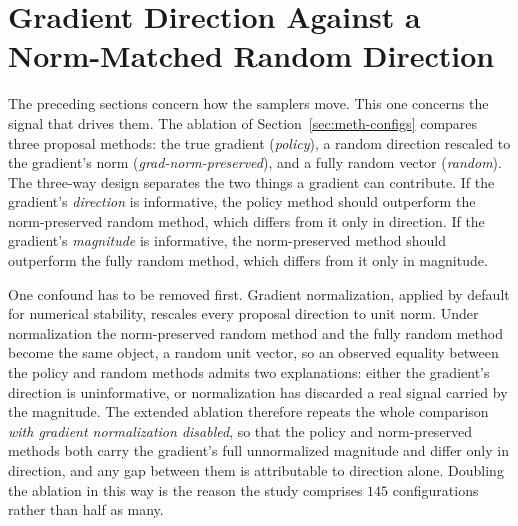 \section{Gradient Direction Against a Norm-Matched Random Direction}
\label{sec:results-fallacy}

The preceding sections concern how the samplers move. This one concerns the signal that drives them. The ablation of Section~\ref{sec:meth-configs} compares three proposal methods: the true gradient (\emph{policy}), a random direction rescaled to the gradient's norm (\emph{grad-norm-preserved}), and a fully random vector (\emph{random}). The three-way design separates the two things a gradient can contribute. If the gradient's \emph{direction} is informative, the policy method should outperform the norm-preserved random method, which differs from it only in direction. If the gradient's \emph{magnitude} is informative, the norm-preserved method should outperform the fully random method, which differs from it only in magnitude.

One confound has to be removed first. Gradient normalization, applied by default for numerical stability, rescales every proposal direction to unit norm. Under normalization the norm-preserved random method and the fully random method become the same object, a random unit vector, so an observed equality between the policy and random methods admits two explanations: either the gradient's direction is uninformative, or normalization has discarded a real signal carried by the magnitude. The extended ablation therefore repeats the whole comparison \emph{with gradient normalization disabled}, so that the policy and norm-preserved methods both carry the gradient's full unnormalized magnitude and differ only in direction, and any gap between them is attributable to direction alone. Doubling the ablation in this way is the reason the study comprises $145$ configurations rather than half as many.

